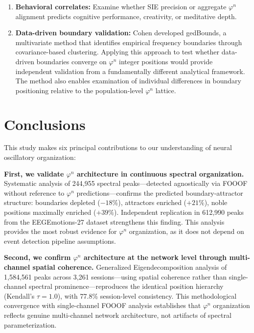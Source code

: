 \documentclass[11pt,a4paper]{article}
\newcommand{\phisym}{\varphi}
\begin{document}
\begin{enumerate}
    \item \textbf{Behavioral correlates:} Examine whether SIE precision or aggregate $\phisym^n$ alignment predicts cognitive performance, creativity, or meditative depth.

    \item \textbf{Data-driven boundary validation:} Cohen \parencite{cohen2021gedbounds} developed gedBounds, a multivariate method that identifies empirical frequency boundaries through covariance-based clustering. Applying this approach to test whether data-driven boundaries converge on $\phisym^n$ integer positions would provide independent validation from a fundamentally different analytical framework. The method also enables examination of individual differences in boundary positioning relative to the population-level $\phisym^n$ lattice.
\end{enumerate}

\section{Conclusions}

This study makes six principal contributions to our understanding of neural oscillatory organization:

\textbf{First, we validate $\phisym^n$ architecture in continuous spectral organization.} Systematic analysis of 244,955 spectral peaks---detected agnostically via FOOOF without reference to $\phisym^n$ predictions---confirms the predicted boundary-attractor structure: boundaries depleted ($-18\%$), attractors enriched ($+21\%$), noble positions maximally enriched ($+39\%$). Independent replication in 612,990 peaks from the EEGEmotions-27 dataset strengthens this finding. This analysis provides the most robust evidence for $\phisym^n$ organization, as it does not depend on event detection pipeline assumptions.

\textbf{Second, we confirm $\phisym^n$ architecture at the network level through multi-channel spatial coherence.} Generalized Eigendecomposition analysis of 1,584,561 peaks across 3,261 sessions---using spatial coherence rather than single-channel spectral prominence---reproduces the identical position hierarchy (Kendall's $\tau = 1.0$), with 77.8\% session-level consistency. This methodological convergence with single-channel FOOOF analysis establishes that $\phisym^n$ organization reflects genuine multi-channel network architecture, not artifacts of spectral parameterization.
\end{document}
